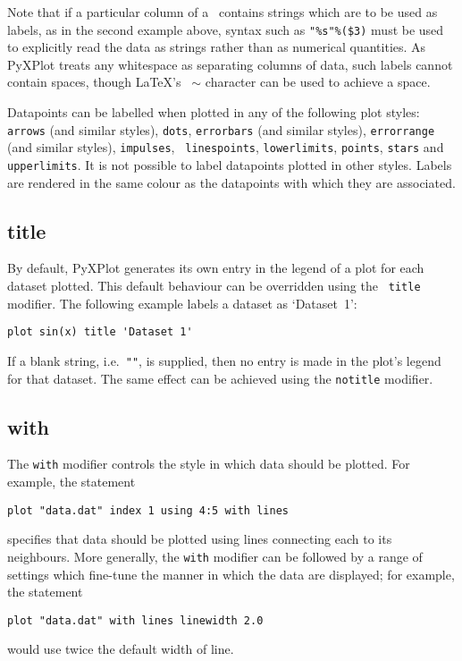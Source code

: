 \noindent Note that if a particular column of a \datafile\ contains strings
which are to be used as labels, as in the second example above, syntax such as 
{\tt "\%s"\%(\$3)} must be used to explicitly read the data as strings rather
than as numerical quantities.  As PyXPlot treats any whitespace as separating
columns of data, such labels cannot contain spaces, though \LaTeX's {\tt
$\sim$} character can be used to achieve a space.

Datapoints can be labelled when plotted in any of the following plot styles:
{\tt arrows} (and similar styles), {\tt dots}, {\tt errorbars} (and similar
styles), {\tt errorrange} (and similar styles), {\tt impulses}, {\tt
linespoints}, {\tt lowerlimits}, {\tt points}, {\tt stars} and {\tt 
upperlimits}. It is not possible to label datapoints plotted in other styles.
Labels are rendered in the same colour as the datapoints with which they are
associated.


\subsection{title}

By default, PyXPlot generates its own entry in the legend of a plot for each
dataset plotted.  This default behaviour can be overridden using the {\tt
title} modifier. The following example labels a dataset as `Dataset~1':

\begin{verbatim}
plot sin(x) title 'Dataset 1'
\end{verbatim}

\noindent If a blank string, i.e.\ {\tt ""}, is supplied, then no entry is made
in the plot's legend for that dataset. The same effect can be achieved using
the {\tt notitle} modifier.


\subsection{with}

The {\tt with} modifier controls the style in which data should be plotted. For
example, the statement
\begin{verbatim}
plot "data.dat" index 1 using 4:5 with lines
\end{verbatim}
specifies that data should be plotted using lines connecting each \datapoint to
its neighbours. More generally, the {\tt with} modifier can be followed by a
range of settings which fine-tune the manner in which the data are displayed;
for example, the statement
\begin{verbatim}
plot "data.dat" with lines linewidth 2.0
\end{verbatim}
would use twice the default width of line.


